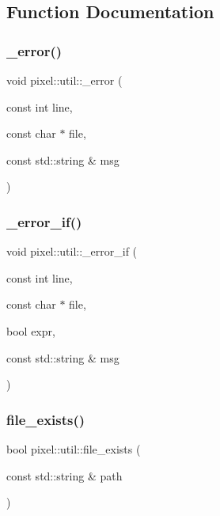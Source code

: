 \subsection{Function Documentation}
\mbox{\label{namespacepixel_1_1util_a25ba63c542a62436db23183014cb16d4}} 
\subsubsection{\texorpdfstring{\+\_\+error()}{\_error()}}
{\footnotesize\ttfamily void pixel\+::util\+::\+\_\+error (\begin{DoxyParamCaption}\item[{const int}]{line,  }\item[{const char $\ast$}]{file,  }\item[{const std\+::string \&}]{msg }\end{DoxyParamCaption})}

\mbox{\label{namespacepixel_1_1util_a32d24684a1bc7da7f5d746d7f40517b1}} 
\subsubsection{\texorpdfstring{\+\_\+error\+\_\+if()}{\_error\_if()}}
{\footnotesize\ttfamily void pixel\+::util\+::\+\_\+error\+\_\+if (\begin{DoxyParamCaption}\item[{const int}]{line,  }\item[{const char $\ast$}]{file,  }\item[{bool}]{expr,  }\item[{const std\+::string \&}]{msg }\end{DoxyParamCaption})}

\mbox{\label{namespacepixel_1_1util_a6e0623837ee2f07f9d9a45ad01cfb054}} 
\subsubsection{\texorpdfstring{file\+\_\+exists()}{file\_exists()}}
{\footnotesize\ttfamily bool pixel\+::util\+::file\+\_\+exists (\begin{DoxyParamCaption}\item[{const std\+::string \&}]{path }\end{DoxyParamCaption})}

